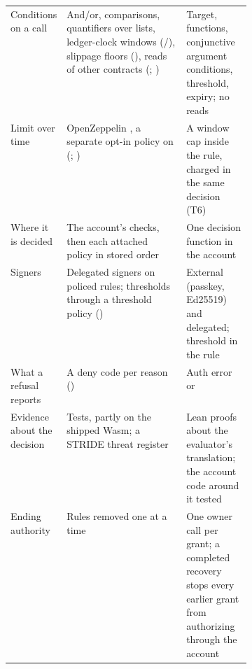 \begin{table}[tbp]
\begin{tabularx}{\linewidth}{@{}>{\raggedright\arraybackslash}p{0.13\linewidth}L>{\raggedright\arraybackslash}p{0.27\linewidth}@{}}
Conditions on a call & And/or, comparisons, quantifiers over lists, ledger-clock windows (/), slippage floors (), reads of other contracts (; ) & Target, functions,  conjunctive argument conditions, threshold, expiry; no reads \\
Limit over time & OpenZeppelin , a separate opt-in policy on  (; ) & A window cap inside the rule, charged in the same decision (T6) \\
Where it is decided & The account's checks, then each attached policy in stored order & One decision function in the account \\
Signers & Delegated signers on policed rules; thresholds through a threshold policy () & External (passkey, Ed25519) and delegated; threshold in the rule \\
What a refusal reports & A deny code per reason () & Auth error  or  \\
Evidence about the decision & Tests, partly on the shipped Wasm; a STRIDE threat register & Lean proofs about the evaluator's translation; the account code around it tested \\
Ending authority & Rules removed one at a time & One owner call per grant; a completed recovery stops every earlier grant from authorizing through the account \\
\bottomrule
\end{tabularx}
\end{table}
